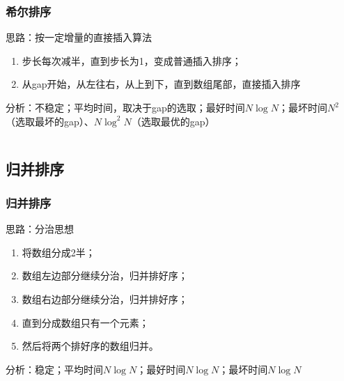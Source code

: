 \documentclass{article}
\begin{document}
    \subsubsection{希尔排序}
    思路：按一定增量的直接插入算法
    \begin{enumerate}
      \item 步长每次减半，直到步长为1，变成普通插入排序；
      \item 从gap开始，从左往右，从上到下，直到数组尾部，直接插入排序
    \end{enumerate}
    分析：不稳定；平均时间，取决于gap的选取；最好时间$N \log N$；最坏时间$N^2$（选取最坏的gap）、$N {\log}^2 N$（选取最优的gap）

    \inputminted{java}{src/chapter02/ShellSort.java}

  \subsection{归并排序}
    \subsubsection{归并排序}
    思路：分治思想
    \begin{enumerate}
      \item 将数组分成2半；
      \item 数组左边部分继续分治，归并排好序；
      \item 数组右边部分继续分治，归并排好序；
      \item 直到分成数组只有一个元素；
      \item 然后将两个排好序的数组归并。
    \end{enumerate}
    分析：稳定；平均时间$N \log N$；最好时间$N \log N$；最坏时间$N \log N$

    \inputminted{java}{src/chapter02/MergeSort.java}
\end{document}
